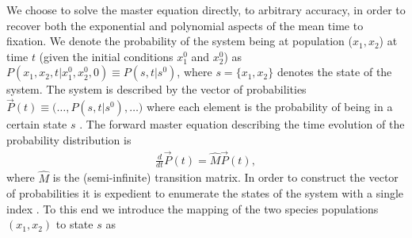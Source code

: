 \documentclass[a4paper,10pt]{article}
\numberwithin{equation}{section} %
\begin{document}
We choose to solve the master equation directly, to arbitrary accuracy, in order to recover both the exponential and polynomial aspects of the mean time to fixation. 
We denote the probability of the system being at population ($x_1,x_2$) at time $t$ (given the initial conditions $x_1^{0}$ and $x_2^{0}$) as $P(x_1,x_2,t|x_1^{0},x_2^{0},0)\equiv P(s,t|s^0)$, where $s=\{x_1,x_2\}$ denotes the state of the system. 
The system is described by the vector of probabilities $\vec{P}(t)\equiv\big(\dots,P(s,t|s^0),\dots \big)$ where each element is the probability of being in a certain state $s$ \cite{Munsky2006}.
The forward master equation describing the time evolution of the probability distribution is \cite{VanKampen1992}
\begin{align} \label{matrix-master-eqn}
 \frac{d}{dt}\vec{P}(t) = \hat{M}\vec{P}(t),
\end{align}
where $\hat{M}$ is the (semi-infinite) transition matrix. %
In order to construct the vector of probabilities it is expedient to enumerate the states of the system with a single index \cite{Munsky2006}.
To this end we introduce the mapping of the two species populations $(x_1,x_2)$ to state $s$ as
\end{document}
